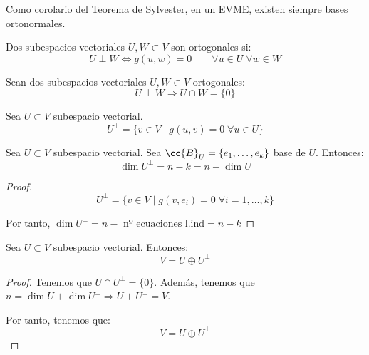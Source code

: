 \begin{observacion}
    Como corolario del Teorema de Sylvester, en un EVME, existen siempre bases ortonormales.
\end{observacion}

\begin{definicion}
    Dos subespacios vectoriales $U,W\subset V$ son ortogonales si:
    \begin{equation*}
        U\perp W \Longleftrightarrow g(u,w)=0 \qquad \forall u\in U \;\forall w\in W
    \end{equation*}
\end{definicion}

\begin{prop}
    Sean dos subespacios vectoriales $U,W\subset V$ ortogonales:
    \begin{equation*}
        U\perp W \Longrightarrow U\cap W = \{0\}
    \end{equation*}
\end{prop}

\begin{definicion}
    Sea $U\subset V$ subespacio vectorial.
    \begin{equation*}
        U^\perp = \{v\in V \mid g(u,v)=0\;\forall u\in U\}
    \end{equation*}
\end{definicion}

\begin{prop}
    Sea $U\subset V$ subespacio vectorial. Sea $\cc{B}_U = \{e_1,\dots,e_k\}$ base de $U$. Entonces:
    \begin{equation*}
        \dim U^\perp = n-k = n-\dim U
    \end{equation*}
\end{prop}
\begin{proof}
    $$U^\perp = \{v\in V\mid g(v,e_i) = 0 \;\forall i=1,\dots,k\}$$

    Por tanto, $\dim U^\perp = n-\text{ nº ecuaciones l.ind} = n-k$
\end{proof}

\begin{prop}
    Sea $U\subset V$ subespacio vectorial. Entonces:
    \begin{equation*}
        V=U\oplus U^\perp
    \end{equation*}
\end{prop}
\begin{proof}
    Tenemos que $U\cap U^\perp = \{0\}$.  Además, tenemos que $n = \dim U + \dim U^\perp \Longrightarrow U+U^\perp = V$.
    
    Por tanto, tenemos que:
    $$V=U\oplus U^\perp$$
\end{proof}

